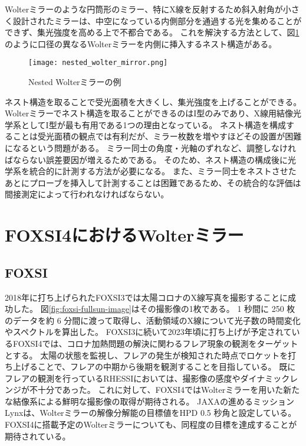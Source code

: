 Wolterミラーのような円筒形のミラー、特にX線を反射するため斜入射角が小さく設計されたミラーは、中空になっている内側部分を通過する光を集めることができず、集光強度を高める上で不都合である。
これを解決する方法として、図\ref{fig:nested_wolter_mirror}のように口径の異なるWolterミラーを内側に挿入するネスト構造がある。\cite{BuitragoCasas2017}

\begin{figure}[b]
\centering
\texttt{[image: nested\_wolter\_mirror.png]}
\caption{Nested Wolterミラーの例}
\label{fig:nested_wolter_mirror}
\end{figure}

ネスト構造を取ることで受光面積を大きくし、集光強度を上げることができる。
Wolterミラーでネスト構造を取ることができるのはI型のみであり、X線用結像光学系としてI型が最も有用である1つの理由となっている。
ネスト構造を構成することは受光面積の観点では有利だが、ミラー枚数を増やすほどその設置が困難になるという問題がある。
ミラー同士の角度・光軸のずれなど、調整しなければならない誤差要因が増えるためである。
そのため、ネスト構造の構成後に光学系を統合的に計測する方法が必要になる。
また、ミラー同士をネストさせたあとにプローブを挿入して計測することは困難であるため、その統合的な評価は間接測定によって行われなければならない。

\clearpage
\newpage

\section{FOXSI4におけるWolterミラー}
\label{chap1_background}

\subsection{FOXSI}
\label{chap1_foxsi}

2018年に打ち上げられたFOXSI3では太陽コロナのX線写真を撮影することに成功した。\cite{weko_20796_1}
図\ref{fig:foxsi-fullsun-image}はその撮影像の1枚である。
1 秒間に 250 枚のデータを約 6 分間に渡って取得し、活動領域のX線について光子数の時間変化やスペクトルを算出した。
FOXSI3に続いて2023年頃に打ち上げが予定されているFOXSI4では、コロナ加熱問題の解決に関わるフレア現象の観測をターゲットとする。
太陽の状態を監視し、フレアの発生が検知された時点でロケットを打ち上げることで、フレアの中期から後期を観測することを目指している。
既にフレアの観測を行っているRHESSI\cite{Liu_2004}においては、撮影像の感度やダイナミックレンジが不十分であった。
これに対して、FOXSI4ではWolterミラーを用いた新たな結像系による鮮明な撮影像の取得が期待される。\cite{2019AGUFMSH31C3315V}
JAXAの進めるミッションLynxは、Wolterミラーの解像分解能の目標値をHPD 0.5 秒角と設定している\cite{Gaskin2019}。
FOXSI4に搭載予定のWolterミラーについても、同程度の目標を達成することが期待されている。

